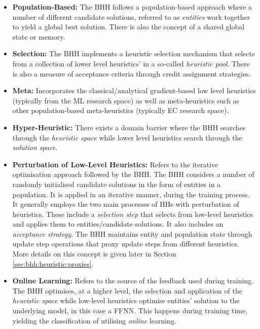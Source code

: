 \begin{itemize}
      \item \textbf{Population-Based:} The \ac{BHH} follows a population-based approach where a number of different candidate solutions, referred to as \textit{entities} work together to yield a global best solution. There is also the concept of a shared global state or memory.

      \item \textbf{Selection:} The \ac{BHH} implements a heuristic selection mechanism that selects from a collection of lower level heuristics' in a so-called \textit{heuristic pool}. There is also a measure of acceptance criteria through credit assignment strategies.

      \item \textbf{Meta:} Incorporates the classical/analytical gradient-based low level heuristics (typically from the \ac{ML} research space) as well as meta-heuristics such as other population-based meta-heuristics (typically \ac{EC} research space).

      \item \textbf{Hyper-Heuristic:} There exists a domain barrier where the \ac{BHH} searches through the \textit{heuristic space} while lower level heuristics search through the \textit{solution space}.

      \item \textbf{Perturbation of Low-Level Heuristics:} Refers to the iterative optimisation approach followed by the \ac{BHH}. The \ac{BHH} considers a number of randomly initialised candidate solutions in the form of entities in a population. It is applied in an iterative manner, during the training process. It generally employs the two main processes of \acp{HH} with perturbation of heuristics. These include a \textit{selection step} that selects from low-level heuristics and applies them to entities/candidate solutions. It also includes an \textit{acceptance strategy}. The \ac{BHH} maintains entity and population state through update step operations that proxy update steps from different heuristics. More details on this concept is given later in Section \ref{sec:bhh:heuristic:proxies}.

      \item \textbf{Online Learning:} Refers to the source of the feedback used during training. The \ac{BHH} optimises, at a higher level, the selection and application of the \textit{heuristic space} while low-level heuristics optimise entities' solution to the underlying model, in this case a \ac{FFNN}. This happens during training time, yielding the classification of utilising \textit{online} learning.
\end{itemize}

